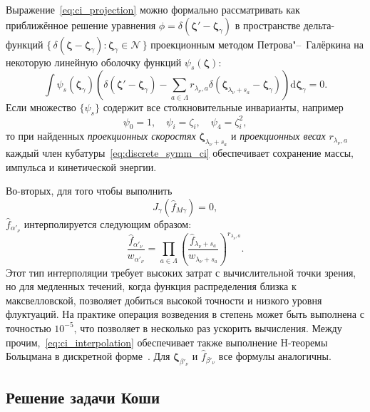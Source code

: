 \documentclass[
aps,%
12pt,%
final,%
notitlepage,%
oneside,%
onecolumn,%
nobibnotes,%
nofootinbib,%
superscriptaddress,%
noshowpacs,%
showkeys,%
floatfix,%
tightenlines,%
centertags]%
{revtex4}
\newcommand{\dd}{\mathrm{d}}
\newcommand{\dzeta}{\boldsymbol{\dd\zeta}}
\newcommand{\bzeta}{\boldsymbol{\zeta}}
\newcommand{\Nu}{\mathcal{N}}
\newcommand{\Set}[2]{\{\,{#1}:{#2}\,\}}
\begin{document}
Выражение~\eqref{eq:ci_projection} можно формально рассматривать как приближённое решение уравнения
\(\phi=\delta(\bzeta'-\bzeta_\gamma)\) в пространстве дельта-функций
\(\Set{\delta(\bzeta-\bzeta_\gamma)}{\bzeta_\gamma\in\Nu}\)
проекционным методом Петрова"--~Галёркина на некоторую линейную оболочку функций \(\psi_s(\bzeta)\):
\begin{equation}\label{eq:Petrov-Galerkin}
    \int \psi_s(\bzeta_\gamma) \left( \delta(\bzeta'-\bzeta_\gamma)
        - \sum_{a\in\Lambda} r_{\lambda_\nu,a} \delta(\bzeta_{\lambda_\nu+s_a}-\bzeta_\gamma) \right) \dzeta_\gamma = 0.
\end{equation}
Если множество \(\{\psi_s\}\) содержит все столкновительные инварианты, например
\begin{equation}\label{eq:collision_invariants}
    \psi_0 = 1, \quad \psi_i = \zeta_i, \quad \psi_4 = \zeta_i^2,
\end{equation}
то при найденных \emph{проекционных скоростях} \(\bzeta_{\lambda_\nu+s_a}\) и \emph{проекционных весах} \(r_{\lambda_\nu,a}\)
каждый член кубатуры~\eqref{eq:discrete_symm_ci} обеспечивает сохранение массы, импульса и кинетической энергии.

Во-вторых, для того чтобы выполнить
\begin{equation}\label{eq:strict_interpolation}
    J_\gamma\left(\hat{f}_{M\gamma}\right) = 0,
\end{equation}
\(\hat{f}_{\alpha'_\nu}\) интерполируется следующим образом:
\begin{equation}\label{eq:ci_interpolation}
    \frac{\hat{f}_{\alpha'_\nu}}{w_{\alpha'_\nu}} = \prod_{a\in\Lambda}
        \left(\frac{\hat{f}_{\lambda_\nu+s_a}}{w_{\lambda_\nu+s_a}} \right)^{r_{\lambda_\nu,a}}.
\end{equation}
Этот тип интерполяции требует высоких затрат с вычислительной точки зрения,
но для медленных течений, когда функция распределения близка к максвелловской,
позволяет добиться высокой точности и низкого уровня флуктуаций.
На практике операция возведения в степень может быть выполнена с точностью \(10^{-5}\),
что позволяет в несколько раз ускорить вычисления.
Между прочим,~\eqref{eq:ci_interpolation} обеспечивает также
выполнение H-теоремы Больцмана в дискретной форме~\citep{Dodulad2013}.
Для \(\bzeta_{\beta'_\nu}\) и \(\hat{f}_{\beta'_\nu}\) все формулы аналогичны.

\subsection{Решение задачи Коши}
\end{document}
